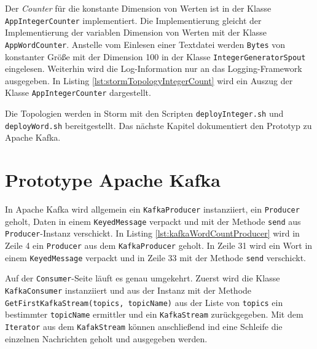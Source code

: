 

Der \textit{Counter} für die konstante Dimension von Werten ist in der Klasse \texttt{AppIntegerCounter} implementiert. Die Implementierung gleicht der Implementierung der variablen Dimension von Werten mit der Klasse \texttt{AppWordCounter}. Anstelle vom Einlesen einer Textdatei werden \texttt{Bytes} von konstanter Größe mit der Dimension 100 in der Klasse \texttt{IntegerGeneratorSpout} eingelesen. Weiterhin wird die Log-Information nur an das Logging-Framework ausgegeben. In Listing \ref{lst:stormTopologyIntegerCount} wird ein Auszug der Klasse \texttt{AppIntegerCounter} dargestellt.



Die Topologien werden in Storm mit den Scripten \texttt{deployInteger.sh} und \texttt{deployWord.sh} bereitgestellt. Das nächste Kapitel dokumentiert den Prototyp zu Apache Kafka.


\section{Prototype Apache Kafka}
\label{sec:prot:kafka}

In Apache Kafka wird allgemein ein \texttt{KafkaProducer} instanziiert, ein \texttt{Producer} geholt, Daten in einem \texttt{KeyedMessage} verpackt und mit der Methode \texttt{send} aus \texttt{Producer}-Instanz verschickt. In Listing \ref{lst:kafkaWordCountProducer} wird in Zeile 4 ein \texttt{Producer} aus dem \texttt{KafkaProducer} geholt. In Zeile 31 wird ein Wort in einem \texttt{KeyedMessage} verpackt und in Zeile 33 mit der Methode \texttt{send} verschickt.



Auf der \texttt{Consumer}-Seite läuft es genau umgekehrt. Zuerst wird die Klasse \texttt{KafkaConsumer} instanziiert und aus der Instanz mit der Methode \texttt{GetFirstKafkaStream(topics, topicName)} aus der Liste von \texttt{topics} ein bestimmter \texttt{topicName} ermittler und ein \texttt{KafkaStream} zurückgegeben. Mit dem \texttt{Iterator} aus dem \texttt{KafakStream} können anschließend ind eine Schleife die einzelnen Nachrichten geholt und ausgegeben werden.

